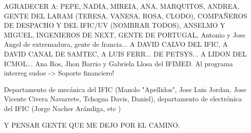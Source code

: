 AGRADECER A: PEPE, NADIA, MIREIA, ANA, MARQUITOS, ANDREA, GENTE DEL LARAM (TERESA, VANESA, ROSA, CLODO), COMPAÑEROS DE DESPACHO Y DEL IFIC/UV (NOMBRAR TODOS), ANSELMO Y MIGUEL, INGENIEROS DE NEXT, GENTE DE PORTUGAL, Antonio y Jose Angel de extremadura, gente de francia...  A DAVID CALVO DEL IFIC, A DAVID CANAL DE SAMTEC, A LUIS FERR... DE PETSYS... A LIDON DEL ICMOL... Ana Ros, Jhon Barrio y Gabriela Llosa del IFIMED. Al programa interreg sudoe -> Soporte financiero!

Departamento de mecánica del IFIC (Manolo "Apellidos", Jose Luis Jordan, Jose Vicente Civera Navarrete, Tchogna Davis, Daniel), departamento de electrónica del IFIC (Jorge Nacher Arándiga, etc )


Y PENSAR GENTE QUE ME DEJO POR EL CAMINO.

